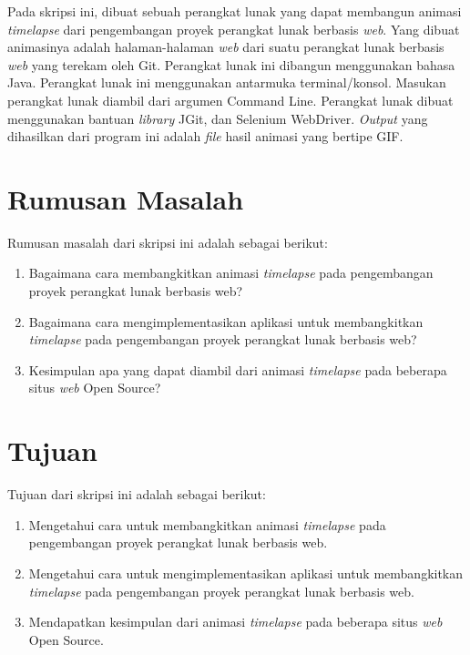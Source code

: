 Pada skripsi ini, dibuat sebuah perangkat lunak yang dapat membangun animasi \textit{timelapse} dari pengembangan proyek perangkat lunak berbasis \textit{web}. Yang dibuat animasinya adalah halaman-halaman  \textit{web} dari suatu perangkat lunak berbasis \textit{web} yang terekam oleh Git. Perangkat lunak ini dibangun menggunakan bahasa Java. Perangkat lunak ini menggunakan antarmuka terminal/konsol. Masukan perangkat lunak diambil dari argumen Command Line. Perangkat lunak dibuat menggunakan bantuan \textit{library} JGit, dan Selenium WebDriver. \textit{Output} yang dihasilkan dari program ini adalah \textit{file} hasil animasi yang bertipe GIF.

\section{Rumusan Masalah}
\label{sec:rumusan}
Rumusan masalah dari skripsi ini adalah sebagai berikut:
\begin{enumerate}
	\item Bagaimana cara membangkitkan animasi \textit{timelapse} pada pengembangan proyek perangkat lunak berbasis web?
	\item Bagaimana cara mengimplementasikan aplikasi untuk membangkitkan \textit{timelapse} pada pengembangan proyek perangkat lunak berbasis web?
	\item Kesimpulan apa yang dapat diambil dari animasi \textit{timelapse} pada beberapa situs \textit{web} Open Source?	
\end{enumerate}

\section{Tujuan}
\label{sec:tujuan}
Tujuan dari skripsi ini adalah sebagai berikut:
\begin{enumerate}
	\item Mengetahui cara untuk membangkitkan animasi \textit{timelapse} pada pengembangan proyek perangkat lunak berbasis web.
	\item Mengetahui cara untuk mengimplementasikan aplikasi untuk membangkitkan \textit{timelapse} pada pengembangan proyek perangkat lunak berbasis web.
	\item Mendapatkan kesimpulan dari animasi \textit{timelapse} pada beberapa situs \textit{web} Open Source.
\end{enumerate}
	

